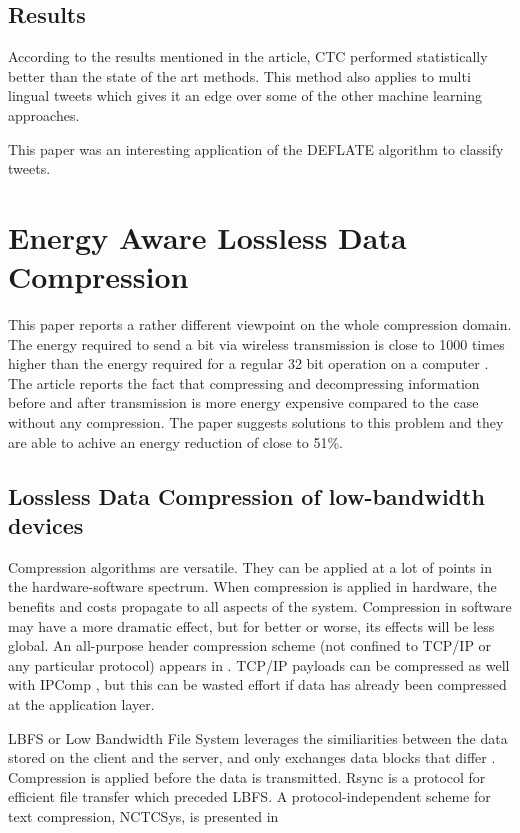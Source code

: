 \documentclass{article}
\begin{document}
\subsection{Results}

According to the results mentioned in the article, CTC performed statistically better than the state of the art methods. This method also applies to multi lingual tweets which gives it an edge over some of the other machine learning approaches.

This paper was an interesting application of the DEFLATE algorithm to classify tweets.


\section{Energy Aware Lossless Data Compression \cite{10.1145/1151690.1151692}}

This paper reports a rather different viewpoint on the whole compression domain. The energy required to send a bit via wireless transmission is close to 1000 times higher than the energy required for a regular 32 bit operation on a computer \cite{note1998writing}. The article reports the fact that compressing and decompressing information before and after transmission is more energy expensive compared to the case without any compression. The paper suggests solutions to this problem and they are able to achive an energy reduction of close to 51\%.

\subsection{Lossless Data Compression of low-bandwidth devices}
Compression algorithms are versatile. They can be applied at a lot of points in the hardware-software spectrum. When compression is applied in hardware, the benefits and costs propagate to all aspects of the system. Compression in software may
have a more dramatic effect, but for better or worse, its effects will be less global. An all-purpose header compression scheme (not confined to TCP/IP or any particular protocol) appears in \cite{lilley2000unified}. TCP/IP payloads can be compressed as well with IPComp \cite{shacham2001rfc3173}, but this can be wasted effort if data has already been compressed at the application layer.

LBFS or Low Bandwidth File System leverages the similiarities between the data stored on the client and the server, and only exchanges data blocks that differ \cite{muthitacharoen2001low}. Compression is applied before the data is transmitted. Rsync \cite{tridgell2000efficient} is a protocol for efficient file transfer which preceded LBFS. A protocol-independent scheme for text compression,
NCTCSys, is presented in \cite{motgi2001network}
\end{document}
